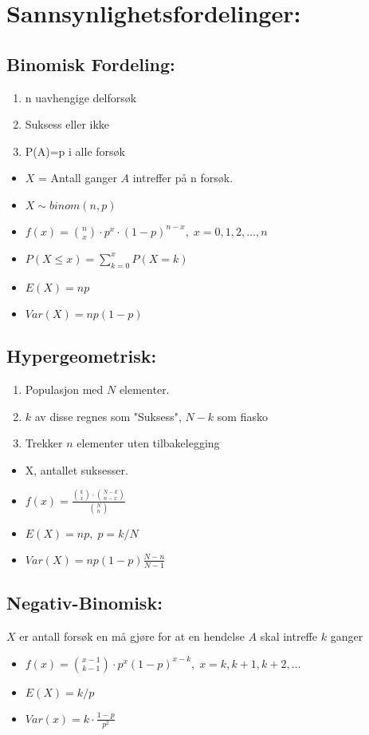 \documentclass[8pt,a4paper,twocolumn,twoside]{article}
\begin{document}
\section*{Sannsynlighetsfordelinger:}
%
%
\subsection*{Binomisk Fordeling:}
\begin{enumerate}[topsep=0pt,itemsep=0pt, partopsep=0pt]
    \item n uavhengige delforsøk
    \item Suksess eller ikke
    \item P(A)=p i alle forsøk
\end{enumerate}
\begin{itemize}[topsep=0pt,itemsep=0pt, partopsep=0pt]
    \item $X$ = Antall ganger $A$ intreffer på n forsøk. 
    \item $X\sim binom(n,p)$
    \item $f(x)= \binom{n}{x} \cdot p^x\cdot (1-p)^{n-x},\; x=0,1,2,\dots,n$
    \item $P(X\leq x)= \sum_{k=0}^{x} P(X=k)$
    \item $E(X)=np$
    \item $Var(X)=np(1-p)$
\end{itemize}
%
%
\subsection*{Hypergeometrisk:}
\begin{enumerate}[topsep=0pt,itemsep=0pt, partopsep=0pt]
    \item Populasjon med $N$ elementer.
    \item $k$ av disse regnes som "Suksess", $N-k$ som fiasko
    \item Trekker $n$ elementer uten tilbakelegging
\end{enumerate}
\begin{itemize}[topsep=0pt,itemsep=0pt, partopsep=0pt]
    \item X, antallet suksesser.
    \item $f(x)=\frac{\binom{k}{x}\cdot\binom{N-k}{n-x}}{\binom{N}{n}}$
    \item $E(X)=np,\;p=k/N$
    \item $Var(X)=np(1-p)\frac{N-n}{N-1}$
\end{itemize}
%
%
\subsection*{Negativ-Binomisk:}
$X$ er antall forsøk en må gjøre for at en hendelse $A$ skal intreffe $k$ ganger
\begin{itemize}[topsep=0pt,itemsep=0pt, partopsep=0pt]
    \item $f(x) = \binom{x-1}{k-1}\cdot p^x(1-p)^{x-k},\;x=k,k+1,k+2,\dots$
    \item $E(X)=k/p$
    \item $Var(x)=k\cdot\frac{1-p}{p^2}$
\end{itemize}
%
%
\end{document}
